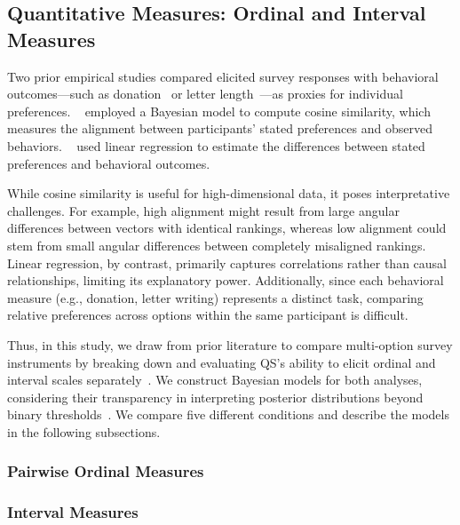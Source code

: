 \subsection{Quantitative Measures: Ordinal and Interval Measures}
\label{sec:quantitative_measures}
Two prior empirical studies compared elicited survey responses with behavioral outcomes—such as donation~\cite{chengCanShowWhat2021,cavaille2024cares} or letter length~\cite{cavaille2024cares}—as proxies for individual preferences. ~\citet{chengCanShowWhat2021} employed a Bayesian model to compute cosine similarity, which measures the alignment between participants' stated preferences and observed behaviors. ~\citet{cavaille2024cares} used linear regression to estimate the differences between stated preferences and behavioral outcomes.

While cosine similarity is useful for high-dimensional data, it poses interpretative challenges. For example, high alignment might result from large angular differences between vectors with identical rankings, whereas low alignment could stem from small angular differences between completely misaligned rankings. Linear regression, by contrast, primarily captures correlations rather than causal relationships, limiting its explanatory power. Additionally, since each behavioral measure (e.g., donation, letter writing) represents a distinct task, comparing relative preferences across options within the same participant is difficult.

Thus, in this study, we draw from prior literature to compare multi-option survey instruments by breaking down and evaluating QS's ability to elicit ordinal and interval scales separately~\cite{collewetPreferenceEstimationPoint2023}. We construct Bayesian models for both analyses, considering their transparency in interpreting posterior distributions beyond binary thresholds~\cite{mcelreath2018statistical, kay2016researcher}. We compare five different conditions and describe the models in the following subsections.

\subsubsection{Pairwise Ordinal Measures}
\label{sec:ordinal_measures}


\subsubsection{Interval Measures}
\label{sec:interval_measures}

